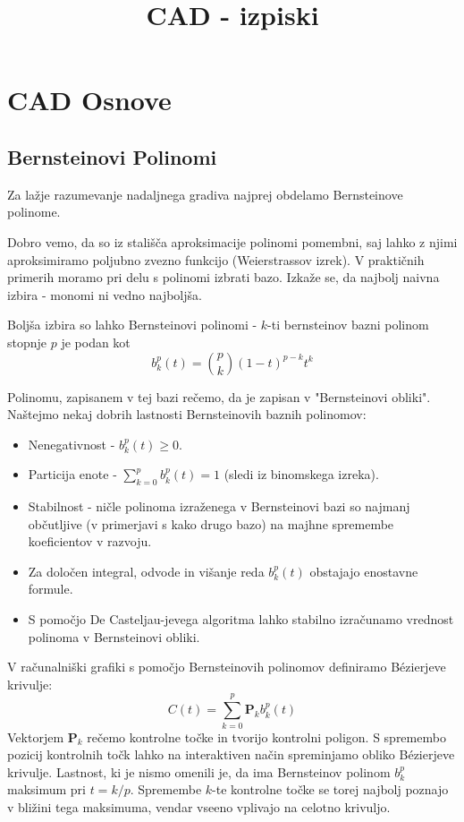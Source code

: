 \documentclass{article}
\begin{document}
\title{CAD - izpiski}
\maketitle

\section{CAD Osnove}
\subsection{Bernsteinovi Polinomi}

Za lažje razumevanje nadaljnega gradiva najprej obdelamo Bernsteinove polinome.

Dobro vemo, da so iz stališča aproksimacije polinomi pomembni, saj lahko z njimi aproksimiramo poljubno zvezno funkcijo (Weierstrassov izrek). V praktičnih primerih moramo pri delu s polinomi izbrati bazo. Izkaže se, da najbolj naivna izbira - monomi ni vedno najboljša. 

Boljša izbira so lahko Bernsteinovi polinomi - $k$-ti bernsteinov bazni polinom stopnje $p$ je podan kot 
\begin{equation}
b_k^p (t) = \binom{p}{k} (1-t)^{p-k} t^k
\end{equation}

Polinomu, zapisanem v tej bazi rečemo, da je zapisan v "Bernsteinovi obliki". 
Naštejmo nekaj dobrih lastnosti Bernsteinovih baznih polinomov:

\begin{itemize}
\item Nenegativnost - $b_k^p(t) \geq 0$.
\item Particija enote - $\sum_{k=0}^p b_k^p (t) = 1$ (sledi iz binomskega izreka).
\item Stabilnost - ničle polinoma izraženega v Bernsteinovi bazi so najmanj občutljive (v primerjavi s kako drugo bazo) na majhne spremembe koeficientov v razvoju.
\item Za določen integral, odvode in višanje reda $b_k^p(t)$ obstajajo enostavne formule.
\item S pomočjo De Casteljau-jevega algoritma lahko stabilno izračunamo vrednost polinoma v Bernsteinovi obliki.
\end{itemize}

V računalniški grafiki s pomočjo Bernsteinovih polinomov definiramo Bézierjeve krivulje:
\begin{equation}
C(t) = \sum_{k=0}^p \textbf{P}_k b_k^p (t)
\end{equation}
Vektorjem $\textbf{P}_k$ rečemo kontrolne točke in tvorijo kontrolni poligon. S spremembo pozicij kontrolnih točk lahko na interaktiven način spreminjamo obliko Bézierjeve krivulje. Lastnost, ki je nismo omenili je, da ima Bernsteinov polinom $b_k^p$ maksimum pri $t=k/p$. Spremembe $k$-te kontrolne točke se torej najbolj poznajo v bližini tega maksimuma, vendar vseeno vplivajo na celotno krivuljo.
\end{document}
